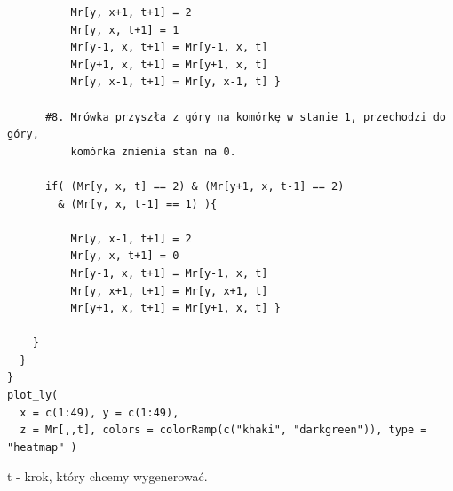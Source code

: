 \documentclass[a4paper,12pt]{article}
\begin{document}
\begin{verbatim}
          Mr[y, x+1, t+1] = 2
          Mr[y, x, t+1] = 1 
          Mr[y-1, x, t+1] = Mr[y-1, x, t] 
          Mr[y+1, x, t+1] = Mr[y+1, x, t] 
          Mr[y, x-1, t+1] = Mr[y, x-1, t] }         
            
      #8. Mrówka przyszła z góry na komórkę w stanie 1, przechodzi do góry,
          komórka zmienia stan na 0.
      
      if( (Mr[y, x, t] == 2) & (Mr[y+1, x, t-1] == 2) 
        & (Mr[y, x, t-1] == 1) ){
        
          Mr[y, x-1, t+1] = 2
          Mr[y, x, t+1] = 0
          Mr[y-1, x, t+1] = Mr[y-1, x, t] 
          Mr[y, x+1, t+1] = Mr[y, x+1, t] 
          Mr[y+1, x, t+1] = Mr[y+1, x, t] }
      
    }
  }
}
plot_ly(
  x = c(1:49), y = c(1:49),
  z = Mr[,,t], colors = colorRamp(c("khaki", "darkgreen")), type = "heatmap" )

\end{verbatim}
t - krok, który chcemy wygenerować.
\end{document}

